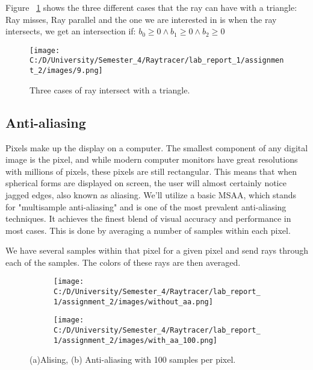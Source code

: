 \documentclass{article}
\begin{document}
	Figure ~\ref{fig:3} shows the three different cases that the ray can have with a triangle: Ray misses, Ray parallel and the one we are interested in is when the ray intersects, we get an intersection if: 
	\( b_0 \geq
	0 \land b_1\geq
	0 \land b_2 \geq
	0 \)
	
	
	
	\begin{figure}[H]
		\begin{center}
			\texttt{[image: C:/D/University/Semester\_4/Raytracer/lab\_report\_1/assignment\_2/images/9.png]}
			
			\caption{Three cases of ray intersect with a triangle.}
			\label{fig:3}
		\end{center}
	\end{figure}
	
	\subsection{Anti-aliasing}
	Pixels make up the display on a computer. The smallest component of any digital image is the pixel, and while modern computer monitors have great resolutions with millions of pixels, these pixels are still rectangular. This means that when spherical forms are displayed on screen, the user will almost certainly notice jagged edges, also known as aliasing.
	We'll utilize a basic MSAA, which stands for "multisample anti-aliasing" and is one of the most prevalent anti-aliasing techniques. It achieves the finest blend of visual accuracy and performance in most cases. This is done by averaging a number of samples within each pixel.
	
	We have several samples within that pixel for a given pixel and send rays through each of the samples. The colors of these rays are then averaged.
	
	\begin{figure}[ht]
		\begin{center}
			\begin{subfigure}{.3\textwidth}
				\centering
				\texttt{[image: C:/D/University/Semester\_4/Raytracer/lab\_report\_1/assignment\_2/images/without\_aa.png]}  
				\caption{}
				\label{fig:sub-first}
			\end{subfigure}
			\begin{subfigure}{.3\textwidth}
				\centering
				\texttt{[image: C:/D/University/Semester\_4/Raytracer/lab\_report\_1/assignment\_2/images/with\_aa\_100.png]}  
				\caption{}
				\label{fig:sub-second}
			\end{subfigure}
			
			\caption{(a)Alising,  (b) Anti-aliasing with 100 samples per pixel.}
			\label{fig:4}
		\end{center}
	\end{figure}
	
\end{document}
